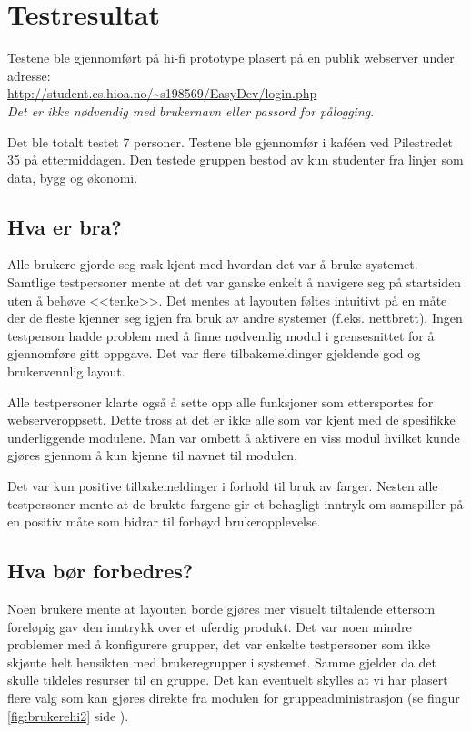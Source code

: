 \section{Testresultat}
Testene ble gjennomført på hi-fi prototype plasert på en publik webserver under adresse:\\ \url{http://student.cs.hioa.no/~s198569/EasyDev/login.php}\\
\textit{Det er ikke nødvendig med brukernavn eller passord for pålogging}.

Det ble totalt testet 7 personer. Testene ble gjennomfør i kaféen ved Pilestredet 35 på ettermiddagen. Den testede gruppen bestod av kun studenter fra linjer som data, bygg og økonomi.

\subsection{Hva er bra?}
Alle brukere gjorde seg rask kjent med hvordan det var å bruke systemet. Samtlige testpersoner mente at det var ganske enkelt å navigere seg på startsiden uten å behøve <<tenke>>. Det mentes at layouten føltes intuitivt på en måte der de fleste kjenner seg igjen fra bruk av andre systemer (f.eks. nettbrett). 
Ingen testperson hadde problem med å finne nødvendig modul i grensesnittet for å gjennomføre gitt oppgave.
Det var flere tilbakemeldinger gjeldende god og brukervennlig layout.

Alle testpersoner klarte også å sette opp alle funksjoner som ettersportes for webserveroppsett. Dette tross at det er ikke alle som var kjent med de spesifikke underliggende modulene. Man var ombett å aktivere en viss modul hvilket kunde gjøres gjennom å kun kjenne til navnet til modulen.

Det var kun positive tilbakemeldinger i forhold til bruk av farger. Nesten alle testpersoner mente at de brukte fargene gir et behagligt inntryk om samspiller på en positiv måte som bidrar til forhøyd brukeropplevelse.

\subsection{Hva bør forbedres?}
Noen brukere mente at layouten borde gjøres mer visuelt tiltalende ettersom foreløpig gav den inntrykk over et uferdig produkt.
Det var noen mindre problemer med å konfigurere grupper, det var enkelte testpersoner som ikke skjønte helt hensikten med brukeregrupper i systemet. 
Samme gjelder da det skulle tildeles resurser til en gruppe. Det kan eventuelt skylles at vi har plasert flere valg som kan gjøres direkte fra modulen for gruppeadministrasjon (se fingur \ref{fig:brukerehi2} side \pageref{fig:brukerehi2}).

